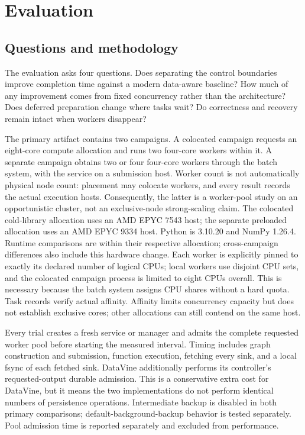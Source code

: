 \section{Evaluation}
\subsection{Questions and methodology}
The evaluation asks four questions. Does separating the control boundaries
improve completion time against a modern data-aware baseline? How much of any
improvement comes from fixed concurrency rather than the architecture? Does
deferred preparation change where tasks wait? Do correctness and recovery
remain intact when workers disappear?

The primary artifact contains two campaigns. A colocated campaign requests an
eight-core compute allocation and runs two four-core workers within it. A
separate campaign obtains two or four four-core workers through the batch
system, with the service on a submission host. Worker count is not automatically
physical node count: placement may colocate workers, and every result records
the actual execution hosts. Consequently, the latter is a worker-pool study
on an opportunistic cluster, not an exclusive-node strong-scaling claim.
The colocated cold-library allocation uses an AMD EPYC 7543 host; the
separate preloaded allocation uses an AMD EPYC 9334 host. Python is 3.10.20
and NumPy 1.26.4. Runtime comparisons are within their respective allocation;
cross-campaign differences also include this hardware change.
Each worker is explicitly pinned to exactly its declared number of logical
CPUs; local workers use disjoint CPU sets, and the colocated campaign process
is limited to eight CPUs overall. This is necessary because the batch system
assigns CPU shares without a hard quota. Task records verify actual affinity.
Affinity limits concurrency capacity but does not establish exclusive cores;
other allocations can still contend on the same host.

Every trial creates a fresh service or manager and admits the complete
requested worker pool before starting the measured interval. Timing includes
graph construction and submission, function execution, fetching every sink,
and a local fsync of each fetched sink. DataVine additionally performs its
controller's requested-output durable admission. This is a conservative extra
cost for DataVine, but it means the two implementations do not perform identical
numbers of persistence operations. Intermediate backup is disabled in both
primary comparisons; default-background-backup behavior is tested separately.
Pool admission time is reported separately and excluded from performance.

